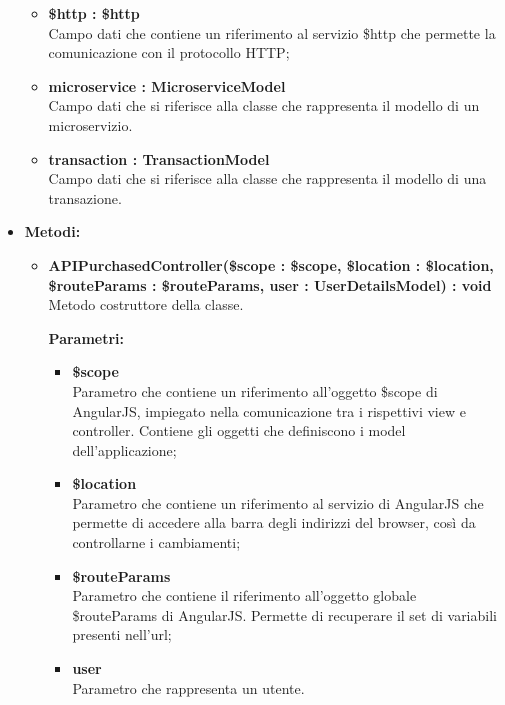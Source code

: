 \begin{itemize}
\begin{itemize}
			\item \textbf{\$http : \$http }\\
			Campo dati che contiene un riferimento al servizio \$http che permette la comunicazione con il protocollo HTTP;
				
			\item \textbf{microservice : MicroserviceModel }\\
			Campo dati che si riferisce alla classe che rappresenta il modello di un microservizio.
			
			\item \textbf{transaction : TransactionModel }\\
			Campo dati che si riferisce alla classe che rappresenta il modello di una transazione.
				
		\end{itemize}
	\item \textbf{Metodi:}
		\begin{itemize}
		
			\item \textbf{APIPurchasedController(\$scope : \$scope, \$location : \$location, \$routeParams : \$routeParams, user : UserDetailsModel) : void}\\
			Metodo costruttore della classe.
			\begin{description}
    			\item[\textbf{Parametri:}]
			\end{description}
			\begin{itemize}
				\item \textbf{\$scope}\\
				Parametro che contiene un riferimento all'oggetto \$scope di AngularJS, impiegato nella comunicazione tra i rispettivi view e controller. Contiene gli oggetti che definiscono i model dell'applicazione;
				
				\item \textbf{\$location}\\
				Parametro che contiene un riferimento al servizio di AngularJS che permette di accedere alla barra degli indirizzi del browser, così da controllarne i cambiamenti;
			
				\item \textbf{\$routeParams}\\
				Parametro che contiene il riferimento all'oggetto globale \$routeParams di AngularJS. Permette di recuperare il set di variabili presenti nell'url;
				
				\item \textbf{user}\\
				Parametro che rappresenta un utente.
			\end{itemize}
			

\end{itemize}
\end{itemize}
